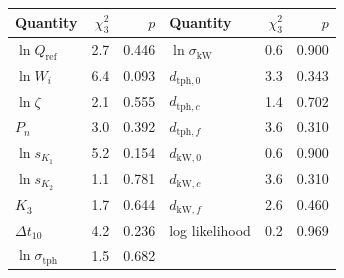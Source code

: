 \begin{tabular}{@{}lrrlrr@{}}
\toprule
Quantity & $\chi^2_{3}$ & $p$ & Quantity & $\chi^2_{3}$ & $p$ \\
\midrule
$\ln Q_{\mathrm{ref}}$ & 2.7 & 0.446 & $\ln\sigma_{\mathrm{kW}}$ & 0.6 & 0.900 \\
$\ln W_i$ & 6.4 & 0.093 & $d_{\mathrm{tph},0}$ & 3.3 & 0.343 \\
$\ln\zeta$ & 2.1 & 0.555 & $d_{\mathrm{tph},c}$ & 1.4 & 0.702 \\
$P_n$ & 3.0 & 0.392 & $d_{\mathrm{tph},f}$ & 3.6 & 0.310 \\
$\ln s_{K_1}$ & 5.2 & 0.154 & $d_{\mathrm{kW},0}$ & 0.6 & 0.900 \\
$\ln s_{K_2}$ & 1.1 & 0.781 & $d_{\mathrm{kW},c}$ & 3.6 & 0.310 \\
$K_3$ & 1.7 & 0.644 & $d_{\mathrm{kW},f}$ & 2.6 & 0.460 \\
$\Delta t_{10}$ & 4.2 & 0.236 & log likelihood & 0.2 & 0.969 \\
$\ln\sigma_{\mathrm{tph}}$ & 1.5 & 0.682 &  &  &  \\
\bottomrule
\end{tabular}
